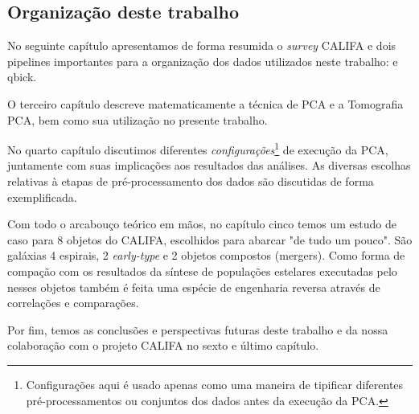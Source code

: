 \subsection{Organização deste trabalho}

No seguinte capítulo apresentamos de forma resumida o {\em survey} CALIFA e dois pipelines importantes para a
organização dos dados utilizados neste trabalho: \pycasso e {\sc qbick}.

O terceiro capítulo descreve matematicamente a técnica de PCA e a Tomografia PCA, bem como sua utilização no presente trabalho. 

No quarto capítulo discutimos diferentes {\em configurações}\footnote{Configurações aqui é usado apenas como uma maneira
de tipificar diferentes pré-processamentos ou conjuntos dos dados antes da execução da PCA.} de execução da PCA,
juntamente com suas implicações aos resultados das análises. As diversas escolhas relativas à etapas de
pré-processamento dos dados são discutidas de forma exemplificada.

Com todo o arcabouço teórico em mãos, no capítulo cinco temos um estudo de caso para 8 objetos do CALIFA, escolhidos
para abarcar "de tudo um pouco". São galáxias 4 espirais, 2 {\em early-type} e 2 objetos compostos (mergers). Como
forma de compação com os resultados da síntese de populações estelares executadas pelo \starlight nesses objetos também
é feita uma espécie de engenharia reversa através de correlações e comparações.

Por fim, temos as conclusões e perspectivas futuras deste trabalho e da nossa colaboração com o projeto CALIFA no sexto
e último capítulo. 

